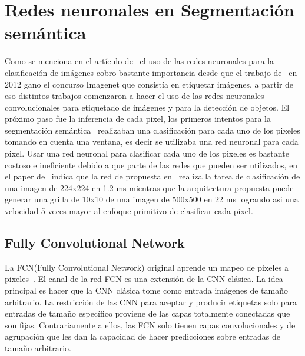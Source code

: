 \section{Redes neuronales en Segmentación semántica}
Como se menciona en el artículo de~\cite{long2015fully} el uso de las redes neuronales para la clasificación de imágenes cobro bastante importancia desde que el trabajo de~\cite{krizhevsky2012imagenet} en 2012 gano el concurso Imagenet que consistía en etiquetar imágenes, a partir de eso distintos trabajos comenzaron a hacer el uso de las redes neuronales convolucionales para etiquetado de imágenes y para la detección de objetos.
El próximo paso fue la inferencia de cada pixel, los primeros intentos para la segmentación semántica~\cite{ning2005toward ,   ciresan2012deep , farabet2013learning} realizaban una clasificación para cada uno de los pixeles tomando en cuenta una ventana, es decir se utilizaba una red neuronal para cada pixel. Usar una red neuronal para clasificar cada uno de los pixeles es bastante costoso e ineficiente debido a que parte de las redes que pueden ser utilizados, en el paper de~\cite{long2015fully} indica que la red de propuesta en~\cite{krizhevsky2012imagenet}  realiza la tarea de clasificación de una imagen de 224x224 en 1.2 ms mientras que la arquitectura propuesta  puede generar una grilla de 10x10 de una imagen de 500x500 en 22 ms logrando asi una velocidad 5 veces mayor al enfoque primitivo de clasificar cada pixel.

\subsection{Fully Convolutional Network}
La \gls{FCN}(Fully Convolutional Network) original aprende un mapeo de pixeles a pixeles~\cite{long2015fully}. El canal de la red \gls{FCN} es una extensión de la \gls{CNN} clásica. La idea principal es hacer que la \gls{CNN} clásica tome como entrada imágenes de tamaño arbitrario. La restricción de las \gls{CNN} para aceptar y producir etiquetas solo para entradas de tamaño específico proviene de las capas totalmente conectadas que son fijas. Contrariamente a ellos, las \gls{FCN} solo tienen capas convolucionales y de agrupación que les dan la capacidad de hacer predicciones sobre entradas de tamaño arbitrario. 


